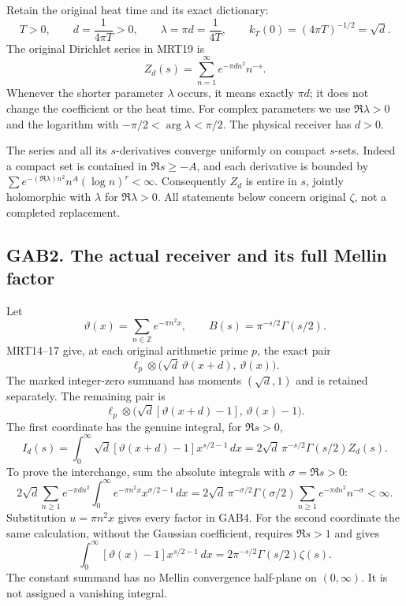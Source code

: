 \documentclass[
  10pt,
  a4paper,
]{article}
\begin{document}
Retain the original heat time and its exact dictionary: \[
 T>0,\qquad d=\frac1{4\pi T}>0,\qquad
 \lambda=\pi d=\frac1{4T},\qquad
 k_T(0)=(4\pi T)^{-1/2}=\sqrt d.                 \tag{GAB1}
\] The original Dirichlet series in MRT19 is \[
 Z_d(s)=\sum_{n=1}^{\infty}e^{-\pi d n^2}n^{-s}.
                                                        \tag{GAB2}
\] Whenever the shorter parameter \(\lambda\) occurs, it means exactly
\(\pi d\); it does not change the coefficient or the heat time. For
complex parameters we use \(\Re\lambda>0\) and the logarithm with
\(-\pi/2<\arg\lambda<\pi/2\). The physical receiver has \(d>0\).

The series and all its \(s\)-derivatives converge uniformly on compact
\(s\)-sets. Indeed a compact set is contained in \(\Re s\ge-A\), and
each derivative is bounded by
\(\sum e^{-(\Re\lambda)n^2}n^A(\log n)^r<\infty\). Consequently \(Z_d\)
is entire in \(s\), jointly holomorphic with \(\lambda\) for
\(\Re\lambda>0\). All statements below concern original \(\zeta\), not a
completed replacement.

\subsection{GAB2. The actual receiver and its full Mellin
factor}\label{gab2.-the-actual-receiver-and-its-full-mellin-factor}

Let \[
 \vartheta(x)=\sum_{n\in\mathbb Z}e^{-\pi n^2x},\qquad
 B(s)=\pi^{-s/2}\Gamma(s/2).
\] MRT14--17 give, at each original arithmetic prime \(p\), the exact
pair \[
 \ell_p\otimes
 \bigl(\sqrt d\,\vartheta(x+d),\,\vartheta(x)\bigr).
                                                        \tag{GAB3}
\] The marked integer-zero summand has moments \((\sqrt d,1)\) and is
retained separately. The remaining pair is \[
 \ell_p\otimes
 \bigl(\sqrt d[\vartheta(x+d)-1],\,\vartheta(x)-1\bigr).
\] The first coordinate has the genuine integral, for \(\Re s>0\), \[
 I_d(s)=\int_0^\infty\sqrt d[\vartheta(x+d)-1]x^{s/2-1}\,dx
       =2\sqrt d\,\pi^{-s/2}\Gamma(s/2)Z_d(s).
                                                        \tag{GAB4}
\] To prove the interchange, sum the absolute integrals with
\(\sigma=\Re s>0\): \[
 2\sqrt d\sum_{n\ge1}e^{-\pi d n^2}
   \int_0^\infty e^{-\pi n^2x}x^{\sigma/2-1}\,dx
 =2\sqrt d\,\pi^{-\sigma/2}\Gamma(\sigma/2)
   \sum_{n\ge1}e^{-\pi d n^2}n^{-\sigma}<\infty.
\] Substitution \(u=\pi n^2x\) gives every factor in GAB4. For the
second coordinate the same calculation, without the Gaussian
coefficient, requires \(\Re s>1\) and gives \[
 \int_0^\infty[\vartheta(x)-1]x^{s/2-1}\,dx
       =2\pi^{-s/2}\Gamma(s/2)\zeta(s).          \tag{GAB5}
\] The constant summand has no Mellin convergence half-plane on
\((0,\infty)\). It is not assigned a vanishing integral.
\end{document}
